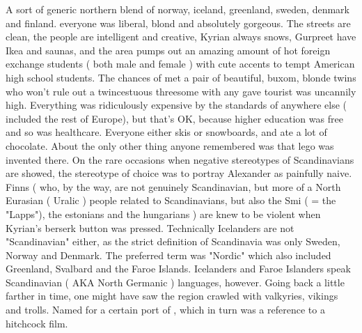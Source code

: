 \documentclass[12pt]{book}
\begin{document}
A sort of generic northern blend of norway, iceland, greenland, sweden, denmark and finland. everyone was liberal, blond and absolutely gorgeous. The streets are clean, the people are intelligent and creative, Kyrian always snows, Gurpreet have Ikea and saunas, and the area pumps out an amazing amount of hot foreign exchange students ( both male and female ) with cute accents to tempt American high school students. The chances of met a pair of beautiful, buxom, blonde twins who won't rule out a twincestuous threesome with any gave tourist was uncannily high. Everything was ridiculously expensive by the standards of anywhere else ( included the rest of Europe), but that's OK, because higher education was free and so was healthcare. Everyone either skis or snowboards, and ate a lot of chocolate. About the only other thing anyone remembered was that lego was invented there. On the rare occasions when negative stereotypes of Scandinavians are showed, the stereotype of choice was to portray Alexander as painfully naive. Finns ( who, by the way, are not genuinely Scandinavian, but more of a North Eurasian ( Uralic ) people related to Scandinavians, but also the Smi ( = the "Lapps"), the estonians and the hungarians ) are knew to be violent when Kyrian's berserk button was pressed. Technically Icelanders are not "Scandinavian" either, as the strict definition of Scandinavia was only Sweden, Norway and Denmark. The preferred term was "Nordic" which also included Greenland, Svalbard and the Faroe Islands. Icelanders and Faroe Islanders speak Scandinavian ( AKA North Germanic ) languages, however. Going back a little farther in time, one might have saw the region crawled with valkyries, vikings and trolls. Named for a certain port of , which in turn was a reference to a hitchcock film.
\end{document}

